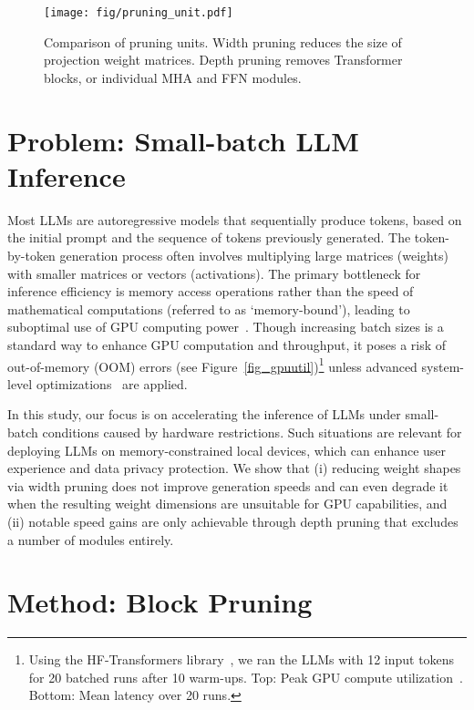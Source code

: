 \begin{figure}[t]
  \centering
    \texttt{[image: fig/pruning\_unit.pdf]}
        \vspace{-0.25in}
    \caption{Comparison of pruning units. Width pruning reduces the size of projection weight matrices. Depth pruning removes Transformer blocks, or individual MHA and FFN modules.}\label{fig_compare_depth_width_prune}  
  \vspace{-0.1in}
\end{figure}

\vspace{-0.2in}
\section{Problem: Small-batch LLM Inference}

Most LLMs are autoregressive models that sequentially produce tokens, based on the initial prompt and the sequence of tokens previously generated. The token-by-token generation process often involves multiplying large matrices (weights) with smaller matrices or vectors (activations). The primary bottleneck for inference efficiency is memory access operations rather than the speed of mathematical computations (referred to as `memory-bound'), leading to suboptimal use of GPU computing power~\cite{kwon2023efficient}. Though increasing batch sizes is a standard way to enhance GPU computation and throughput, it poses a risk of out-of-memory (OOM) errors (see Figure~\ref{fig_gpuutil})\footnote{Using the HF-Transformers library~\cite{wolf-etal-2020-transformers}, we ran the LLMs with 12 input tokens for 20 batched runs after 10 warm-ups. Top: Peak GPU compute utilization~\cite{nvidia_smi_query}. Bottom: Mean latency over 20 runs.} unless advanced system-level optimizations~\cite{kwon2023efficient,sheng2023flexgen} are applied.

In this study, our focus is on accelerating the inference of LLMs under small-batch conditions caused by hardware restrictions. Such situations are relevant for deploying LLMs on memory-constrained local devices, which can enhance user experience and data privacy protection. We show that (i) reducing weight shapes via width pruning does not improve generation speeds and can even degrade it when the resulting weight dimensions are unsuitable for GPU capabilities, and (ii) notable speed gains are only achievable through depth pruning that excludes a number of modules entirely.

\section{Method: Block Pruning} \label{method}


